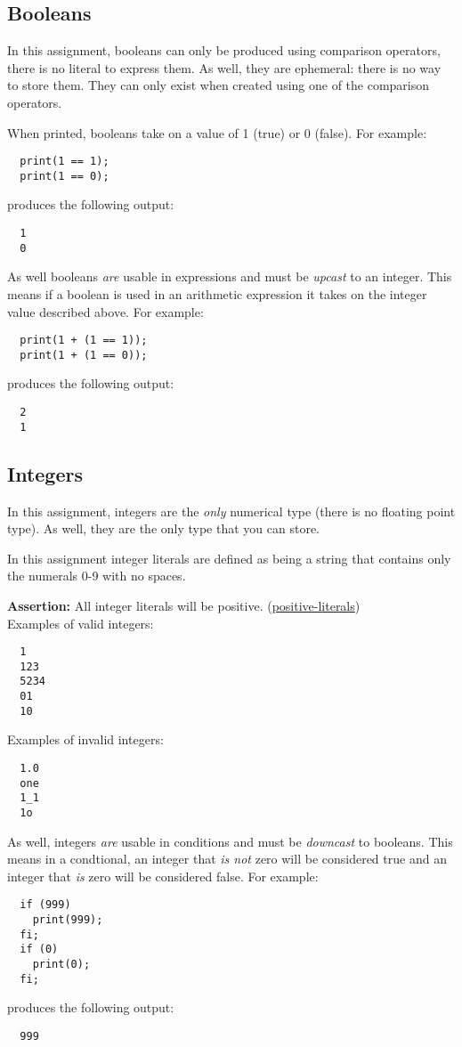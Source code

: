 \documentclass{article}
\newcommand{\assertion}[2]{\textbf{Assertion: }#1 (\hyperlink{#2}{#2})}
\begin{document}
\subsection{Booleans}
In this assignment, booleans can only be produced using comparison operators, there is no literal to
express them. As well, they are ephemeral: there is no way to store them. They can only exist when
created using one of the comparison operators.

When printed, booleans take on a value of 1 (true) or 0 (false). For example:
\begin{lstlisting}
  print(1 == 1);
  print(1 == 0);
\end{lstlisting}
produces the following output:
\begin{lstlisting}
  1
  0
\end{lstlisting}

As well booleans \textit{are} usable in expressions and must be \textit{upcast} to an integer.
This means if a boolean is used in an arithmetic expression it takes on the integer value described
above. For example:
\begin{lstlisting}
  print(1 + (1 == 1));
  print(1 + (1 == 0));
\end{lstlisting}
produces the following output:
\begin{lstlisting}
  2
  1
\end{lstlisting}

\subsection{Integers}
In this assignment, integers are the \textit{only} numerical type (there is no floating point type).
As well, they are the only type that you can store.

In this assignment integer literals are defined as being a string that contains only the numerals
0-9 with no spaces.

\assertion{All integer literals will be positive.}{positive-literals}\\

Examples of valid integers:
\begin{lstlisting}
  1
  123
  5234
  01
  10
\end{lstlisting}

Examples of invalid integers:
\begin{lstlisting}
  1.0
  one
  1_1
  1o
\end{lstlisting}

As well, integers \textit{are} usable in conditions and must be \textit{downcast} to booleans. This
means in a condtional, an integer that \textit{is not} zero will be considered true and an integer
that \textit{is} zero will be considered false. For example:
\begin{lstlisting}
  if (999)
    print(999);
  fi;
  if (0)
    print(0);
  fi;
\end{lstlisting}
produces the following output:
\begin{lstlisting}
  999
\end{lstlisting}
\end{document}
